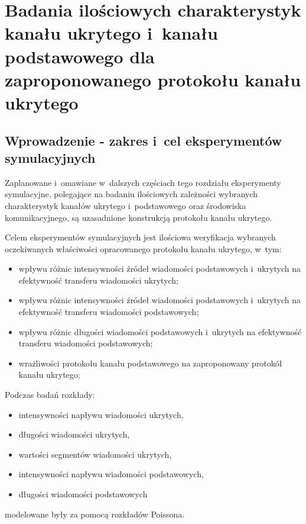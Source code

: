 \documentclass[a4paper, twoside, 12pt]{report}
\begin{document}
\chapter{Badania ilościowych charakterystyk kanału ukrytego i~kanału podstawowego dla zaproponowanego protokołu kanału ukrytego}
    \section{Wprowadzenie - zakres i~cel eksperymentów symulacyjnych}
    Zaplanowane i~omawiane w~dalszych częściach tego rozdziału eksperymenty symulacyjne,
    polegające na badaniu ilościowych zależności wybranych charakterystyk kanałów
    ukrytego i~podstawowego oraz środowiska komunikacyjnego, są uzasadnione konstrukcją
    protokołu kanału ukrytego.

    Celem eksperymentów symulacyjnych jest ilościowa weryfikacja wybranych oczekiwanych właściwości
    opracowanego protokołu kanału ukrytego, w~tym:
    \begin{itemize} \itemsep1pt \parskip0pt 
        \item wpływu różnic intensywności źródeł wiadomości podstawowych i~ukrytych na
            efektywność transferu wiadomości ukrytych;
        \item wpływu różnic intensywności źródeł wiadomości podstawowych i~ukrytych na
            efektywność transferu wiadomości podstawowych;
        \item wpływu różnic długości wiadomości podstawowych i~ukrytych na efektywność
            transferu wiadomości podstawowych;
        \item wrażliwości protokołu kanału podstawowego na zaproponowany protokół
            kanału ukrytego;
    \end{itemize}

    Podczas badań rozkłady:
    \begin{itemize} \itemsep1pt \parskip0pt 
        \item intensywności napływu wiadomości ukrytych,
        \item długości wiadomości ukrytych,
        \item wartości segmentów wiadomości ukrytych,
        \item intensywności napływu wiadomości podstawowych,
        \item długości wiadomości podstawowych
    \end{itemize}
    modelowane były za pomocą rozkładów Poissona. \\
\end{document}
